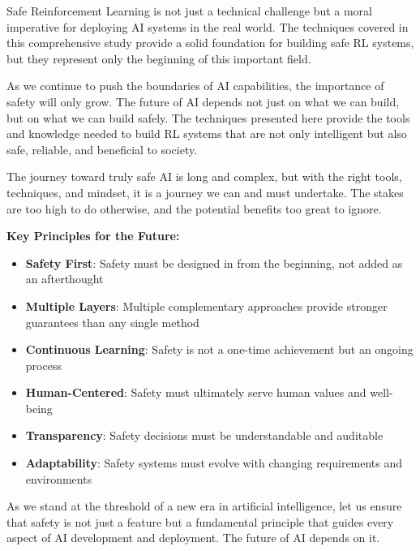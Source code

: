 \documentclass[12pt]{article}
\begin{document}
{{{{Safe Reinforcement Learning is not just a technical challenge but a moral imperative for deploying AI systems in the real world. The techniques covered in this comprehensive study provide a solid foundation for building safe RL systems, but they represent only the beginning of this important field.

As we continue to push the boundaries of AI capabilities, the importance of safety will only grow. The future of AI depends not just on what we can build, but on what we can build safely. The techniques presented here provide the tools and knowledge needed to build RL systems that are not only intelligent but also safe, reliable, and beneficial to society.

The journey toward truly safe AI is long and complex, but with the right tools, techniques, and mindset, it is a journey we can and must undertake. The stakes are too high to do otherwise, and the potential benefits too great to ignore.

\textbf{Key Principles for the Future:}
\begin{itemize}
\item \textbf{Safety First}: Safety must be designed in from the beginning, not added as an afterthought
\item \textbf{Multiple Layers}: Multiple complementary approaches provide stronger guarantees than any single method
\item \textbf{Continuous Learning}: Safety is not a one-time achievement but an ongoing process
\item \textbf{Human-Centered}: Safety must ultimately serve human values and well-being
\item \textbf{Transparency}: Safety decisions must be understandable and auditable
\item \textbf{Adaptability}: Safety systems must evolve with changing requirements and environments
\end{itemize}

As we stand at the threshold of a new era in artificial intelligence, let us ensure that safety is not just a feature but a fundamental principle that guides every aspect of AI development and deployment. The future of AI depends on it.




\newpage

{\selectfont {\color{DarkBlue}

\begin{thebibliography}{9}


\end{thebibliography}}}}}}}
\end{document}
